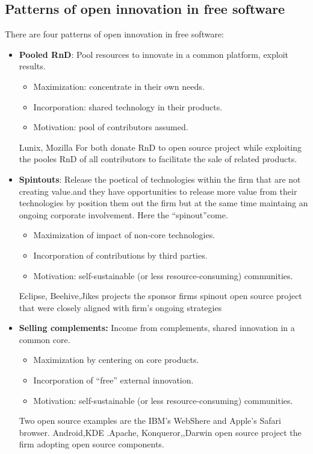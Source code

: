 \subsection* {Patterns of open innovation in free software} \label{Patterns of open innovation in free software}
There are four patterns of open innovation in free software:
\begin{itemize}
 \item  \textbf {Pooled RnD}: Pool resources to innovate in a common platform, exploit results.
 \begin{itemize}
		\item Maximization: concentrate in their own needs.
		\item Incorporation: shared technology in their products.
		\item Motivation: pool of contributors assumed.
	\end{itemize}
Lunix, Mozilla For both donate RnD to open source project while exploiting the pooles RnD of all contributors to facilitate the sale of related products.


 \item  \textbf {Spintouts}: Release the poetical of technologies within the firm that are not creating value.and they have opportunities to release more value from their technologies by position them out the firm but at the same time maintaing an ongoing corporate involvement. Here the “spinout”come.
	\begin{itemize}
		\item Maximization of impact of non-core technologies.
		\item Incorporation of contributions by third parties.
		\item Motivation: self-sustainable (or less resource-consuming) communities.
	\end{itemize}
Eclipse, Beehive,Jikes projects the sponsor firms spinout open source project that were closely aligned with firm’s ongoing strategies

 \item \textbf{Selling complements:} Income from complements, shared innovation in a common core.
	\begin{itemize}
		\item Maximization by centering on core products.
		\item Incorporation of “free” external innovation.
		\item Motivation: self-sustainable (or less resource-consuming) communities.
	\end{itemize}
Two open source examples are the IBM’s WebShere and Apple’s Safari browser.
Android,KDE .Apache, Konqueror,,Darwin open source project the firm adopting open source components.


\end{itemize}
